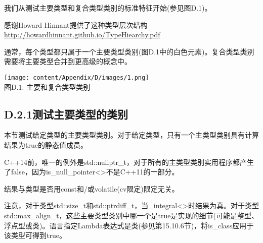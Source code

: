 
我们从测试主要类型和复合类型类别的标准特征开始(参见图D.1)。

\begin{tcolorbox}[colback=webgreen!5!white,colframe=webgreen!75!black]
\hspace*{0.75cm}感谢Howard Hinnant提供了这种类型层次结构\url{http://howardhinnant.github.io/TypeHiearchy.pdf}
\end{tcolorbox}

通常，每个类型都只属于一个主要类型类别(图D.1中的白色元素)。复合类型类别需要将主要类型合并到更高级的概念中。

\begin{center}
\texttt{[image: content/Appendix/D/images/1.png]} \\
图D.1. 主要和复合类型类别
\end{center}

\subsection{D.2.1\hspace{0.2cm}测试主要类型的类别}

本节测试给定类型的主要类型类别。对于给定类型，只有一个主类型类别具有计算结果为true的静态值成员。

\begin{tcolorbox}[colback=webgreen!5!white,colframe=webgreen!75!black]
\hspace*{0.75cm}C++14前，唯一的例外是std::nullptr\_t，对于所有的主类型类别实用程序都产生了false，因为is\_null\_pointer<>不是C++11的一部分。
\end{tcolorbox}

结果与类型是否用const和/或volatile(cv限定)限定无关。

注意，对于类型std::size\_t和std::ptrdiff\_t，当\_integral<>时结果为真。对于类型std::max\_align\_t，这些主要类型类别中哪一个是true是实现的细节(可能是整型、浮点型或类)。语言指定Lambda表达式是类(参见第15.10.6节)，将is\_class应用于该类型可得到true。

